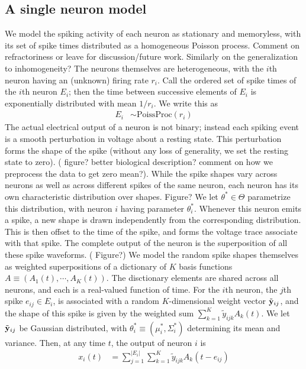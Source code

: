\subsection{A single neuron model}
We model the spiking activity of each neuron as stationary and memoryless, with its set of spike times distributed as a homogeneous Poisson process. 
{\color{red} Comment on refractoriness or leave for
discussion/future work. Similarly on the generalization to inhomogeneity?} The neurons themselves are heterogeneous, with the $i$th neuron having
an (unknown) firing rate $r_i$. Call the ordered set of spike times of the $i$th neuron $E_i$; then the time between successive elements of $E_i$ is 
exponentially distributed with mean $1/r_i$. We write this as
\begin{align}
  E_i &\sim \text{PoissProc}(r_i)
\end{align}
The actual electrical output of a neuron is not binary; instead each spiking event is a smooth perturbation in voltage about a
resting state. This perturbation forms the shape of the spike (without any loss of generality, we set the resting state to zero). 
{(\color{red} figure? better biological description? comment on how we preprocess the data to get zero mean?)}. 
While the spike shapes vary across neurons as well as across different spikes of the same neuron, each 
neuron has its own characteristic distribution over shapes. {\color{red} Figure? } 
We let $\theta^* \in \Theta$ parametrize this distribution, with neuron $i$ having parameter $\theta^*_i$. Whenever this neuron emits a 
spike, a new shape is drawn independently from the corresponding distribution. %
This is then offset to the time of the spike, and forms the voltage trace associate with that spike. The complete output of the neuron is the 
superposition of all these spike waveforms. 
{\color{red} ( Figure?)} %
We model the random spike shapes themselves as weighted superpositions of a dictionary of $K$ basis functions $A \equiv (A_1(t), \cdots, A_K(t))$. The
disctionary elements are shared across all neurons, and each is a real-valued function of time.
For the $i$th neuron, the $j$th spike $e_{ij} \in E_i$, is associated with a random $K$-dimensional weight vector $\tilde{\mathbf{y}}_{ij}$, and the 
shape of this spike is given by the weighted sum $\sum_{k=1}^K \tilde{y}_{ijk} A_k(t)$. We let $\tilde{\mathbf{y}}_{ij}$ be Gaussian distributed, with 
$\theta^*_i \equiv (\mu^*_i, \Sigma^*_i)$ determining its 
mean and variance. Then, at any time $t$, the output of neuron $i$ is
\begin{align}
  x_{i}(t) &= \sum_{j=1}^{|E_i|} \sum_{k=1}^K \tilde{y}_{ijk} A_k(t - e_{ij})
\end{align}

